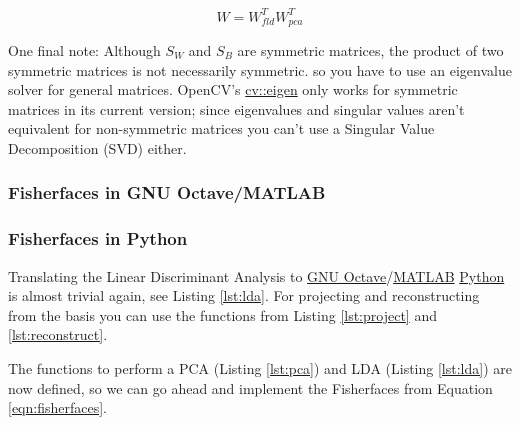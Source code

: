 \begin{equation} \label{eqn:fisherfaces}
W = W_{fld}^{T} W_{pca}^{T}
\end{equation}

One final note: Although $S_{W}$ and $S_{B}$ are symmetric matrices, the product of two symmetric matrices is not necessarily symmetric. so you have to use an eigenvalue solver for general matrices. OpenCV's \href{http://opencv.willowgarage.com/documentation/cpp/operations_on_arrays.html#cv-eigen}{cv::eigen} only works for symmetric matrices in its current version; since eigenvalues and singular values aren't equivalent for non-symmetric matrices you can't use a Singular Value Decomposition (SVD) either.

\ifx\python\undefined 
	\subsubsection{Fisherfaces in GNU Octave/MATLAB}
\else
 \subsubsection{Fisherfaces in Python}
\fi

\label{ssection:example_fisherfaces}

Translating the Linear Discriminant Analysis to \ifx\python\undefined \href{http://www.gnu.org/software/octave/}{GNU Octave}/\href{http://www.mathworks.com}{MATLAB} \else \href{http://www.python.org}{Python} \fi is almost trivial again, see Listing \ref{lst:lda}. For projecting and reconstructing from the basis you can use the functions from Listing \ref{lst:project} and \ref{lst:reconstruct}.

\ifx\python\undefined
	
\else
		
\fi

The functions to perform a PCA (Listing \ref{lst:pca}) and LDA (Listing \ref{lst:lda}) are now defined, so we can go ahead and implement the Fisherfaces from Equation \ref{eqn:fisherfaces}. 

\ifx\python\undefined
	
\else
	
\fi

